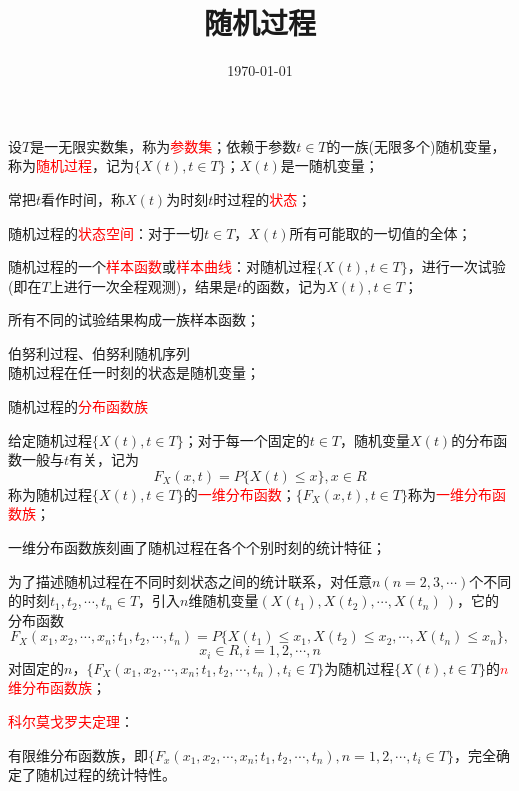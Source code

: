 \documentclass[12pt,a4paper]{article}
\title{随机过程}
\author{}
\date{\today}
\begin{document}
\maketitle
设$T$是一无限实数集，称为\textcolor{red}{参数集}；依赖于参数$t\in T$的一族(无限多个)随机变量，称为\textcolor{red}{随机过程}，记为$\{X(t), t\in T\}$；$X(t)$是一随机变量；

常把$t$看作时间，称$X(t)$为时刻$t$时过程的\textcolor{red}{状态}；

随机过程的\textcolor{red}{状态空间}：对于一切$t\in T$，$X(t)$所有可能取的一切值的全体；

随机过程的一个\textcolor{red}{样本函数}或\textcolor{red}{样本曲线}：对随机过程$\{X(t), t\in T\}$，进行一次试验(即在$T$上进行一次全程观测)，结果是$t$的函数，记为$X(t), t\in T$；

所有不同的试验结果构成一族样本函数；

伯努利过程、伯努利随机序列 \\

随机过程在任一时刻的状态是随机变量；

随机过程的\textcolor{red}{分布函数族}

给定随机过程$\{X(t), t\in T\}$；对于每一个固定的$t\in T$，随机变量$X(t)$的分布函数一般与$t$有关，记为
\begin{equation}
F_X (x,t) = P\{X(t)\leq x\}, x\in R
\end{equation}
称为随机过程$\{X(t), t\in T\}$的\textcolor{red}{一维分布函数}；$\{F_X (x,t),t\in T\}$称为\textcolor{red}{一维分布函数族}；

一维分布函数族刻画了随机过程在各个个别时刻的统计特征；

为了描述随机过程在不同时刻状态之间的统计联系，对任意$n(n = 2, 3, \cdots)$个不同的时刻$t_1, t_2, \cdots, t_n\in T$，引入$n$维随机变量$(X(t_1), X(t_2), \cdots, X(t_n)~)$，它的分布函数
\begin{equation}
F_X (x_1, x_2, \cdots, x_n; t_1, t_2, \cdots, t_n )=P\{X(t_1 )\leq x_1, X(t_2 )\leq x_2, \cdots, X(t_n )\leq x_n \},
\end{equation}
\begin{equation}
x_i\in R, i = 1, 2, \cdots, n
\end{equation}
对固定的$n$，$\{F_X (x_1, x_2, \cdots, x_n; t_1, t_2, \cdots, t_n ), t_i\in T\}$为随机过程$\{X(t), t\in T\}$的\textcolor{red}{$n$维分布函数族}；

\textcolor{red}{科尔莫戈罗夫定理}：

有限维分布函数族，即$\{F_x (x_1,x_2, \cdots, x_n; t_1, t_2, \cdots, t_n), n = 1, 2, \cdots, t_i\in T\}$，完全确定了随机过程的统计特性。
\end{document}
